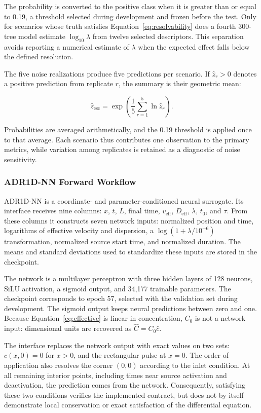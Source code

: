 \documentclass[11pt,a4paper]{article}
\begin{document}
The probability is converted to the positive class when it is greater than or
equal to 0.19, a threshold selected during development and frozen before the
test. Only for scenarios whose truth satisfies Equation~\eqref{eq:resolvability}
does a fourth 300-tree model estimate $\log_{10}\lambda$ from twelve selected
descriptors. This separation avoids reporting a numerical estimate of
$\lambda$ when the expected effect falls below the defined resolution.

The five noise realizations produce five predictions per scenario. If
$\widehat z_r>0$ denotes a positive prediction from replicate $r$, the summary
is their geometric mean:

\begin{equation}
\widehat z_{\mathrm{esc}}
=\exp\!\left(\frac{1}{5}\sum_{r=1}^{5}\ln\widehat z_r\right).
\end{equation}

Probabilities are averaged arithmetically, and the 0.19 threshold is applied
once to that average. Each scenario thus contributes one observation to the
primary metrics, while variation among replicates is retained as a diagnostic
of noise sensitivity.

\subsubsection{ADR1D-NN Forward Workflow}

ADR1D-NN is a coordinate- and parameter-conditioned neural surrogate. Its
interface receives nine columns: $x$, $t$, $L$, final time,
$v_{\mathrm{eff}}$, $D_{\mathrm{eff}}$, $\lambda$, $t_0$, and $\tau$. From
these columns it constructs seven network inputs: normalized position and time,
logarithms of effective velocity and dispersion, a
$\log(1+\lambda/10^{-6})$ transformation, normalized source start time, and
normalized duration. The means and standard deviations used to standardize
these inputs are stored in the checkpoint.

The network is a multilayer perceptron with three hidden layers of 128 neurons,
SiLU activation, a sigmoid output, and 34,177 trainable parameters. The
checkpoint corresponds to epoch 57, selected with the validation set during
development. The sigmoid output keeps neural predictions between zero and one.
Because Equation~\eqref{eq:effective} is linear in concentration, $C_0$ is not
a network input: dimensional units are recovered as
$\widehat C=C_0\widehat c$.

The interface replaces the network output with exact values on two sets:
$c(x,0)=0$ for $x>0$, and the rectangular pulse at $x=0$. The order of
application also resolves the corner $(0,0)$ according to the inlet condition.
At all remaining interior points, including times near source activation and
deactivation, the prediction comes from the network. Consequently, satisfying
these two conditions verifies the implemented contract, but does not by itself
demonstrate local conservation or exact satisfaction of the differential
equation.
\end{document}
